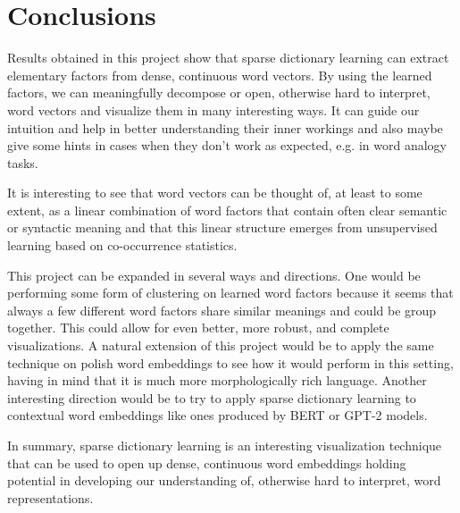 \documentclass[10pt, a4paper, twocolumn]{article} %
\begin{document}

\section{Conclusions}

Results obtained in this project show that sparse dictionary learning can extract elementary factors from dense, continuous word vectors. By using the learned factors, we can meaningfully decompose or open, otherwise hard to interpret, word vectors and visualize them in many interesting ways. It can guide our intuition and help in better understanding their inner workings and also maybe give some hints in cases when they don’t work as expected, e.g. in word analogy tasks. 

It is interesting to see that word vectors can be thought of, at least to some extent, as a linear combination of word factors that contain often clear semantic or syntactic meaning and that this linear structure emerges from unsupervised learning based on co-occurrence statistics.

This project can be expanded in several ways and directions. One would be performing some form of clustering on learned word factors because it seems that always a few different word factors share similar meanings and could be group together. This could allow for even better, more robust, and complete visualizations. A natural extension of this project would be to apply the same technique on polish word embeddings to see how it would perform in this setting, having in mind that it is much more morphologically rich language. Another interesting direction would be to try to apply sparse dictionary learning to contextual word embeddings like ones produced by BERT or GPT-2 models. 

In summary, sparse dictionary learning is an interesting visualization technique that can be used to open up dense, continuous word embeddings holding potential in developing our understanding of, otherwise hard to interpret, word representations.
\end{document}
